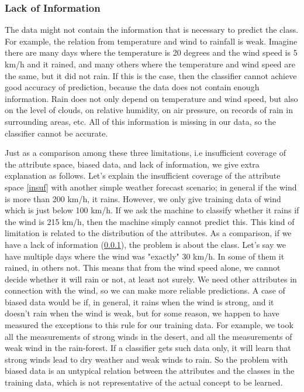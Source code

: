 \documentclass[10pt,a4paper]{article}
\begin{document}
\subsubsection{Lack of Information}\label{lack}
The data might not contain the information that is necessary to predict the class. For example, the relation from temperature and wind to rainfall is weak. Imagine there are many days where the temperature is 20 degrees and the wind speed is 5 km/h and it rained, and many others where the temperature and wind speed are the same, but it did not rain. If this is the case, then the classifier cannot achieve good accuracy of prediction, because the data does not contain enough information. Rain does not only depend on temperature and wind speed, but also on the level of clouds, on relative humidity, on air pressure, on records of rain in surrounding areas, etc. All of this information is missing in our data, so the classifier cannot be accurate. 

Just as a comparison among  these three limitations, i.e insufficient coverage of the attribute space, biased data, and lack of information, we give extra explanation as follows. Let's explain the insufficient coverage of the attribute space  \ref{insuf} with another  simple weather forecast scenario; in general if the wind is more than 200 km/h, it rains. However, we only give training  data of wind which is just below 100 km/h.  If we  ask the machine to classify whether it rains if the wind is  215 km/h, then the machine simply cannot predict this. This kind of limitation is related to the distribution of the attributes. As a comparison, if we have a lack of information (\ref{lack}), the problem is about the class. Let's say we have multiple days where the wind was "exactly" 30 km/h. In some of them it rained, in others not. This means that from the wind speed alone, we cannot decide whether it will rain or not, at least not surely. We need other attributes in connection with the wind, so we can make more reliable predictions. A case of biased data would be if, in general, it rains when the wind is strong, and it doesn't rain when the wind is weak, but for some reason, we happen to have measured the exceptions to this rule for our training data. For example, we took all the measurements of strong winds in the desert, and all the measurements of weak wind in the rain-forest. If a classifier gets such data only, it will learn that strong winds lead to dry weather and weak winds to rain. So the problem with biased data is an untypical relation between the attributes and the classes in the training data, which is not representative of the actual concept to be learned.
\end{document}
